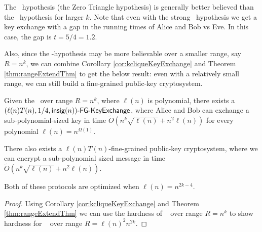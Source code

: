 The \zThclique~hypothesis (the Zero Triangle hypothesis) is generally better believed than the \zkclique~hypothesis for larger $k$. Note that even with the strong \zThclique~hypothesis we get a key exchange with a gap in the running times of Alice and Bob vs Eve. In this case, the gap is $t = 5/4 = 1.2$.

Also, since the \zkclique-hypothesis may be more believable over a smaller range, say $R = n^k$, we can combine Corollary \ref{cor:kcliqueKeyExchange} and Theorem \ref{thm:rangeExtendThm} to get the below result: even with a relatively small range, we can still build a fine-grained public-key cryptosystem.

\begin{corollary}
	Given the \strongzkc~over range $R = n^{k}$, where $\ell(n)$ is polynomial, there exists a $(\ell(n)T(n), 1/4, \mathsf{insig}(n))\textsf{-FG-KeyExchange}$, where Alice and Bob can exchange a sub-polynomial-sized key in time $\tilde{O}\left(n^{k}\sqrt{\ell(n)} + n^2\ell(n)\right)$ for every polynomial $\ell(n)= n ^{\Omega(1)}$.
	
	There also exists a $\ell(n)T(n)$-fine-grained public-key cryptosystem, where we can encrypt a sub-polynomial sized message in time $\tilde{O}\left(n^{k}\sqrt{\ell(n)} + n^2\ell(n)\right)$.
	
	Both of these protocols are optimized when $\ell(n) = n^{2k-4}$.
	\label{cor:kcliqueKeyExchangeRange}
\end{corollary}
\begin{proof}
	Using Corollary \ref{cor:kcliqueKeyExchange} and Theorem \ref{thm:rangeExtendThm} we can use the hardness of \strongzkc~ over range $R = n^{k}$ to show hardness for \strongzkc~ over range $R = \ell(n)^2n^{2k}$.
\end{proof}

